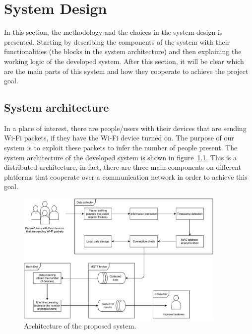 \chapter{System Design}
\label{cha:system}
\vspace{0.4 cm} 

In this section, the methodology and the choices in the system design is presented. Starting by describing the components of the system with their functionalities (the blocks in the system architecture) and then explaining the working logic of the developed system. After this section, it will be clear which are the main parts of this system and how they cooperate to achieve the project goal.


\section{System architecture}
\label{sec:sysarc}
\vspace{0.2 cm} 

In a place of interest, there are people/users with their devices that are sending Wi-Fi packets, if they have the Wi-Fi device turned on. The purpose of our system is to exploit these packets to infer the number of people present. The system architecture of the developed system is shown in figure~\ref{fig:architecture}. 
This is a distributed architecture, in fact, there are three main components on different platforms that cooperate over a communication network in order to achieve this goal.

\begin{figure}[h]
\centering 
\includegraphics[width=0.9\textwidth]{images/architecture} 
\caption{Architecture of the proposed system.}
\label{fig:architecture}
\end{figure}

